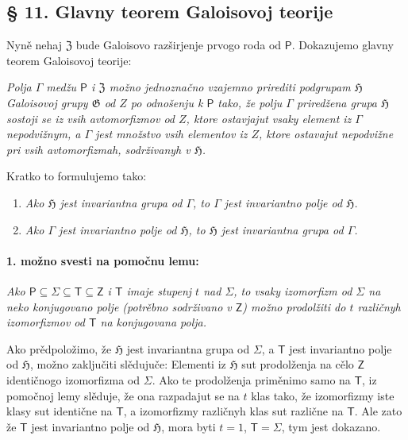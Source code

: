 \documentclass[11pt]{article}
\begin{document}
\subsection*{§ 11. Glavny teorem Galoisovoj teorije}\label{der-hauptsatz-der-galoisschen-theorie}

Nyně nehaj \(\mathfrak Z\) bude Galoisovo razširjenje prvogo roda od \(\mathsf P\). Dokazujemo glavny teorem Galoisovoj teorije:

\emph{Polja \(\Gamma\) medžu \(\mathsf P\) i \(\mathfrak Z\) možno jednoznačno vzajemno prirediti podgrupam \(\mathfrak H\) Galoisovoj grupy \(\mathfrak G\) od \(Z\) po odnošenju k \(\mathsf P\) tako, že polju \(\Gamma\) priredžena grupa \(\mathfrak H\) sostoji se iz vsih avtomorfizmov od \(Z\), ktore ostavjajut vsaky element iz \(\Gamma\) nepodvižnym, a \(\Gamma\) jest množstvo vsih elementov iz \(Z\), ktore ostavajut nepodvižne pri vsih avtomorfizmah, sodrživanyh v \(\mathfrak H\).}

Kratko to formulujemo tako:

\begin{enumerate}
\item \emph{Ako \(\mathfrak H\) jest invariantna grupa od \(\Gamma\), to \(\Gamma\) jest invariantno polje od \(\mathfrak H\).}
\item \emph{Ako \(\Gamma\) jest invariantno polje od \(\mathfrak H\), to \(\mathfrak H\) jest invariantna grupa od \(\Gamma\).}
\end{enumerate}

\paragraph{1. možno svesti na pomočnu lemu:}\label{laesst-sich-zurueckfuehren-auf-den-hilfssatz}

\emph{Ako \(\mathsf P \subseteq \Sigma \subseteq \mathsf T \subseteq \mathsf Z\) i \(\mathsf T\) imaje stupenj \(t\) nad \(\Sigma\), to vsaky izomorfizm od \(\Sigma\) na neko konjugovano polje (potrěbno sodrživano v \(\mathsf Z\)) možno prodolžiti do \(t\) različnyh izomorfizmov od \(\mathsf T\) na konjugovana polja.}

Ako prědpoložimo, že \(\mathfrak H\) jest invariantna grupa od \(\Sigma\), a \(\mathsf T\) jest invariantno polje od \(\mathfrak H\), možno zaključiti slědujuče: Elementi iz \(\mathfrak H\) sut prodolženja na cělo \(\mathsf Z\) identičnogo izomorfizma od \(\Sigma\). Ako te prodolženja priměnimo samo na \(\mathsf T\), iz pomočnoj lemy slěduje, že ona razpadajut se na \(t\) klas tako, že izomorfizmy iste klasy sut identične na \(\mathsf T\), a izomorfizmy različnyh klas sut različne na \(\mathsf T\). Ale zato že \(\mathsf T\) jest invariantno polje od \(\mathfrak H\), mora byti \(t=1\), \(\mathsf T=\Sigma\), tym jest dokazano.
\end{document}
